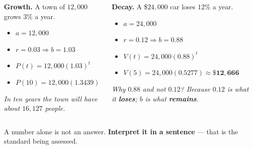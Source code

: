 \documentclass[aspectratio=169, 11pt]{beamer}
\begin{document}
\begin{frame}[t, plain]
  \begin{columns}[T]
    \begin{column}{0.48\textwidth}
      \textbf{Growth.} A town of $12{,}000$ grows $3\%$ a year.
      \begin{itemize}\setlength{\itemsep}{3pt}
        \item $a=12{,}000$
        \item $r=0.03 \Rightarrow b=1.03$
        \item $P(t)=12{,}000(1.03)^{t}$
        \item $P(10)=12{,}000(1.3439)\approx \mathbf{16{,}127}$
      \end{itemize}
      \vspace{3pt}
      {\footnotesize \emph{In ten years the town will have about $16{,}127$ people.}}
    \end{column}
    \begin{column}{0.48\textwidth}
      \textbf{Decay.} A \$$24{,}000$ car loses $12\%$ a year.
      \begin{itemize}\setlength{\itemsep}{3pt}
        \item $a=24{,}000$
        \item $r=0.12 \Rightarrow b=0.88$
        \item $V(t)=24{,}000(0.88)^{t}$
        \item $V(5)=24{,}000(0.5277)\approx \mathbf{\$12{,}666}$
      \end{itemize}
      \vspace{3pt}
      {\footnotesize \emph{Why $0.88$ and not $0.12$? Because $0.12$ is what it \textbf{loses};
      $b$ is what \textbf{remains}.}}
    \end{column}
  \end{columns}
  \vspace{6pt}
  \begin{center}
    {\footnotesize A number alone is not an answer. \textbf{Interpret it in a sentence} --- that is
    the standard being assessed.}
  \end{center}
\end{frame}
\end{document}
